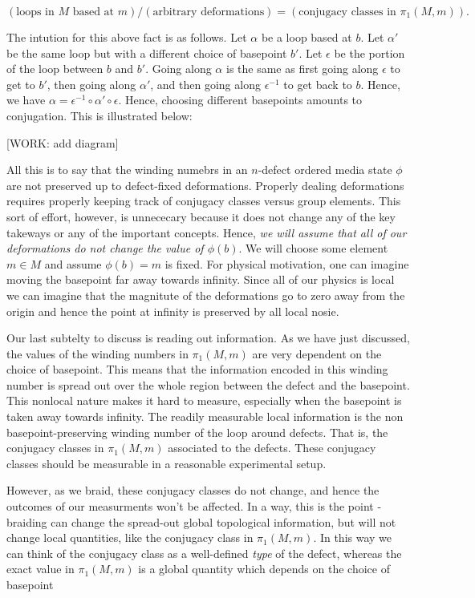 \documentclass{article}
\theoremstyle{definition}
\newcommand{\0}{\left|0\right>}
\newcommand{\1}{\left|1\right>}
\numberwithin{figure}{section}
\begin{document}
$$\left(\text{loops in $M$ based at $m$}\right)/\left(\text{arbitrary deformations}\right)= \left(\text{conjugacy classes in }\pi_1(M,m)\right).$$

The intution for this above fact is as follows. Let $\alpha$ be a loop based at $b$. Let $\alpha'$ be the same loop but with a different choice of basepoint $b'$. Let $\epsilon$ be the portion of the loop between $b$ and $b'$. Going along $\alpha$ is the same as first going along $\epsilon$ to get to $b'$, then going along $\alpha'$, and then going along $\epsilon^{-1}$ to get back to $b$. Hence, we have $\alpha = \epsilon^{-1}\circ \alpha' \circ \epsilon$. Hence, choosing different basepoints amounts to conjugation. This is illustrated below:

[WORK: add diagram]

All this is to say that the winding numebrs in an $n$-defect ordered media state $\phi$ are not preserved up to defect-fixed deformations. Properly dealing deformations requires properly keeping track of conjugacy classes versus group elements. This sort of effort, however, is unnececary because it does not change any of the key takeways or any of the important concepts. Hence, \textit{we will assume that all of our deformations do not change the value of $\phi(b)$}. We will choose some element $m\in M$ and assume $\phi(b)=m$ is fixed. For physical motivation, one can imagine moving the basepoint far away towards infinity. Since all of our physics is local we can imagine that the magnitute of the deformations go to zero away from the origin and hence the point at infinity is preserved by all local nosie.

Our last subtelty to discuss is reading out information. As we have just discussed, the values of the winding numbers in $\pi_1(M,m)$ are very dependent on the choice of basepoint. This means that the information encoded in this winding number is spread out over the whole region between the defect and the basepoint. This nonlocal nature makes it hard to measure, especially when the basepoint is taken away towards infinity. The readily measurable local information is the non basepoint-preserving winding number of the loop around defects. That is, the conjugacy classes in $\pi_1(M,m)$ associated to the defects. These conjugacy classes should be measurable in a reasonable experimental setup.

However, as we braid, these conjugacy classes do not change, and hence the outcomes of our measurments won't be affected. In a way, this is the point - braiding can change the spread-out global topological information, but will not change local quantities, like the conjugacy class in $\pi_1(M,m)$. In this way we can think of the conjugacy class as a well-defined \textit{type} of the defect, whereas the exact value in $\pi_1(M,m)$ is a global quantity which depends on the choice of basepoint
\end{document}
